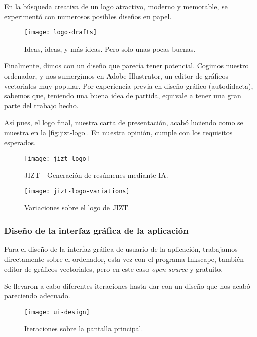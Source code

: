 En la búsqueda creativa de un logo atractivo, moderno y memorable, se experimentó con numerosos posibles diseños en papel.

\begin{figure}[h!]
	\centering
	\texttt{[image: logo-drafts]}
	\caption{Ideas, ideas, y más ideas. Pero solo unas pocas buenas.}
\end{figure}

Finalmente, dimos con un diseño que parecía tener potencial. Cogimos nuestro ordenador, y nos sumergimos en Adobe Illustrator, un editor de gráficos vectoriales muy popular. Por experiencia previa en diseño gráfico (autodidacta), sabemos que, teniendo una buena idea de partida, equivale a tener una gran parte del trabajo hecho.

Así pues, el logo final, nuestra carta de presentación, acabó luciendo como se muestra en la \autoref{fig:jizt-logo}. En nuestra opinión, cumple con los requisitos esperados.

\newpage

\begin{figure}[H]
	\centering
	\texttt{[image: jizt-logo]}
	\caption{JIZT - Generación de resúmenes mediante IA.}
	\label{fig:jizt-logo}
\end{figure}

\begin{figure}[H]
	\centering
	\texttt{[image: jizt-logo-variations]}
	\caption{Variaciones sobre el logo de JIZT.}
\end{figure}

\newpage

\subsubsection{Diseño de la interfaz gráfica de la aplicación}

Para el diseño de la interfaz gráfica de usuario de la aplicación, trabajamos directamente sobre el ordenador, esta vez con el programa Inkscape, también editor de gráficos vectoriales, pero en este caso \emph{open-source} y gratuito.

Se llevaron a cabo diferentes iteraciones hasta dar con un diseño que nos acabó pareciendo adecuado.

\bigskip

\begin{figure}[H]
	\centering
	\texttt{[image: ui-design]}
	\vspace{-0.5cm}
	\caption{Iteraciones sobre la pantalla principal.}
\end{figure}

